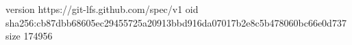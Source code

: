 version https://git-lfs.github.com/spec/v1
oid sha256:cb87dbb68605ec29455725a20913bbd916da07017b2e8c5b478060bc66e0d737
size 174956
